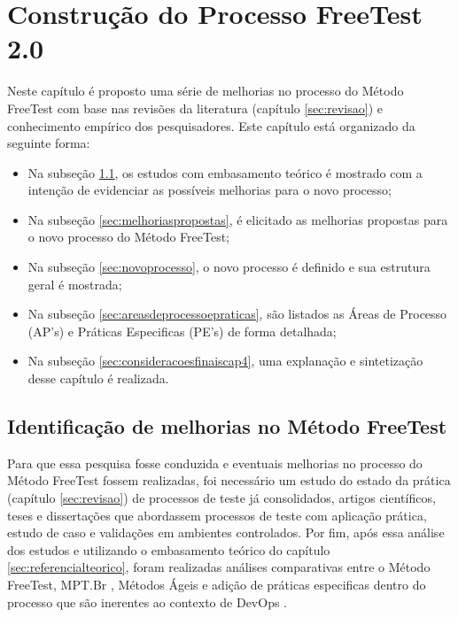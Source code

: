 \chapter{Construção do Processo FreeTest 2.0}
\label{sec:construcaoframeworkprocesso}

Neste capítulo é proposto uma série de melhorias no processo do Método FreeTest com base nas revisões da literatura (capítulo \ref{sec:revisao}) e conhecimento empírico dos pesquisadores. Este capítulo está organizado da seguinte forma:

\begin{itemize}
    \item Na subseção \ref{sec:identificacaomelhoriasfreetest}, os estudos com embasamento teórico é mostrado com a intenção de evidenciar as possíveis melhorias para o novo processo;
    \item Na subseção \ref{sec:melhoriaspropostas}, é elicitado as melhorias propostas para o novo processo do Método FreeTest;
    \item Na subseção \ref{sec:novoprocesso}, o novo processo é definido e sua estrutura geral é mostrada;
    \item Na subseção \ref{sec:areasdeprocessoepraticas}, são listados as Áreas de Processo (AP's) e Práticas Especificas (PE's) de forma detalhada;
    \item Na subseção \ref{sec:consideracoesfinaiscap4}, uma explanação e sintetização desse capítulo é realizada.
\end{itemize}

\section{Identificação de melhorias no Método FreeTest}
\label{sec:identificacaomelhoriasfreetest}

Para que essa pesquisa fosse conduzida e eventuais melhorias no processo do Método FreeTest fossem realizadas, foi necessário um estudo do estado da prática (capítulo \ref{sec:revisao}) de processos de teste já consolidados, artigos científicos, teses e dissertações que abordassem processos de teste com aplicação prática, estudo de caso e validações em ambientes controlados. Por fim, após essa análise dos estudos e utilizando o embasamento teórico do capítulo \ref{sec:referencialteorico}, foram realizadas análises comparativas entre o Método FreeTest, MPT.Br \cite{GuiaMPTbr}, Métodos Ágeis \cite{Beck2001} e adição de práticas especificas dentro do processo que são inerentes ao contexto de DevOps \cite{Debois2008}. 

